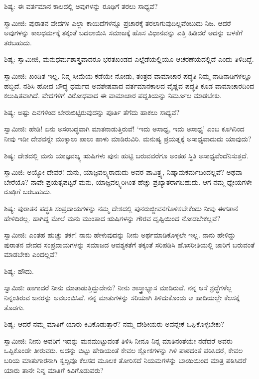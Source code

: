 ಶಿಷ್ಯ: ಈ ವರ್ತಮಾನ ಕಾಲದಲ್ಲಿ ಅವುಗಳನ್ನು ರೂಢಿಗೆ ತರಲು ಸಾಧ್ಯವೆ?

ಸ್ವಾಮೀಜಿ: ಪುರಾತನ ವೇದಗಳ ಎಲ್ಲಾ ಕಾಯಿದೆಗಳನ್ನೂ ಪ್ರಚಾರಕ್ಕೆ ತರಲಾಗುವುದಿಲ್ಲವೆಂಬುದು ನಿಜ. ಆದರೆ ಅವುಗಳನ್ನು ಕಾಲಧರ್ಮಕ್ಕೆ ತಕ್ಕಂತೆ ಬದಲಾಯಿಸಿ ಸಮಾಜಕ್ಕೆ ಹೊಸ ವಿಧಾನವನ್ನು ಎತ್ತಿ ಹಿಡಿದರೆ ಅದನ್ನು ಬಳಕೆಗೆ ತರಬಹುದು.

ಶಿಷ್ಯ: ಸ್ವಾಮೀಜಿ, ಮನುಧರ್ಮಶಾಸ್ತ್ರವಾದರೂ ಭರತಖಂಡದ ಎಲ್ಲೆಡೆಯಲ್ಲಿಯೂ ಆಚರಣೆಯದಲ್ಲಿದೆ ಎಂದು ತಿಳಿದಿದ್ದೆ.

ಸ್ವಾಮೀಜಿ: ಖಂಡಿತ ಇಲ್ಲ. ನಿನ್ನ ಸೀಮೆಯ ಕಡೆಯೇ ನೋಡು, ತಂತ್ರದ ವಾಮಾಚಾರ ಪದ್ಧತಿ ನಿಮ್ಮ ನಾಡಿನಾಡಿಗಳಲ್ಲೂ ಹಬ್ಬಿದೆ. ನಶಿಸಿ ಹೋದ ಬೌದ್ಧ ಧರ್ಮದ ಅವಶೇಷವಾದ ವರ್ತಮಾನಕಾಲದ ವೈಷ್ಣವ ಪದ್ಧತಿ ಕೂಡ ವಾಮಾಚಾರದಿಂದ ಕಲುಷಿತವಾಗಿದೆ. ವೇದಗಳಿಗೆ ವಿರೋಧವಾದ ಈ ವಾಮಾಚಾರ ಪದ್ದತಿಯನ್ನು ನಿರ್ಮೂಲ ಮಾಡಬೇಕು.

ಶಿಷ್ಯ: ಅಷ್ಟು ದಿನಗಳಿಂದ ಬೇರುಬಿಟ್ಟಿರುವುದನ್ನು ಪೂರ್ತಿ ತೆಗೆದು ಹಾಕಲು ಸಾಧ್ಯವೆ?

ಸ್ವಾಮೀಜಿ: ಹೇಡಿ! ಏನು ಅಸಂಬದ್ಧವಾಗಿ ಮಾತನಾಡುತ್ತಿರುವೆ! ‘ಇದು ಅಸಾಧ್ಯ, ಇದು ಅಸಾಧ್ಯ’ ಎಂಬ ಕೂಗಿನಿಂದ ನೀವು ಇಡೀ ದೇಶವನ್ನೇ ಮುಕ್ಕಾಲು ಪಾಲು ಹಾಳು ಮಾಡಿರುವಿರಿ. ಮನುಷ್ಯ ಪ್ರಯತ್ನಕ್ಕೆ ಅಸಾಧ್ಯವಾದುದು ಯಾವುದು?

ಶಿಷ್ಯ: ದೇಶದಲ್ಲಿ ಮನು ಯಾಜ್ಞವಲ್ಕ್ಯ ಋಷಿಗಳು ಪುನಃ ಹುಟ್ಟಿ ಬರುವವರೆಗೂ ಅಂತಹ ಸ್ಥಿತಿ ಅಸಾಧ್ಯವೆಂದೆನಿಸುತ್ತದೆ.

ಸ್ವಾಮಿಜಿ: ಅಯ್ಯೋ ದೇವರೆ! ಮನು, ಯಾಜ್ಞವಲ್ಕ್ಯರಾದುದು ಅವರ ಪಾವಿತ್ರ್ಯ, ನಿಷ್ಕಾಮಕರ್ಮದಿಂದಲ್ಲವೆ? ಅಥವಾ ಬೇರೆಯೊ? ನಾವೇ ಪ್ರಯತ್ನಪಟ್ಟರೆ ಮನು, ಯಾಜ್ಞವಲ್ಕ್ಯರಿಗಿಂತ ಹೆಚ್ಚು ಪ್ರಖ್ಯಾತರಾಗಬಹುದು. ಆಗ ನಮ್ಮ ಧ್ಯೇಯಗಳೇ ರೂಢಿಗೆ ಬರಬಹುದು.

ಶಿಷ್ಯ: ಪುರಾತನ ಪದ್ಧತಿ ಸಂಪ್ರದಾಯಗಳನ್ನು ನಮ್ಮ ದೇಶದಲ್ಲಿ ಪುನರುಜ್ಜೀವನಗೊಳಿಸಬೇಕೆಂದು ನೀವು ಈಗತಾನೆ ಹೇಳಿದಿರಲ್ಲ. ಹಾಗಿದ್ದ ಮೇಲೆ ಮನು ಮುಂತಾದ ಋಷಿಗಳನ್ನು ಗೌರವ ದೃಷ್ಟಿಯಿಂದ ನೋಡಬೇಕಲ್ಲವೆ?

ಸ್ವಾಮೀಜಿ: ಎಂತಹ ಹುಚ್ಚು ತರ್ಕ! ನಾನು ಹೇಳುವುದನ್ನು ನೀನು ಅರ್ಥಮಾಡಿಕೊಳ್ಳಲೇ ಇಲ್ಲ. ನಾನು ಹೇಳಿದ್ದು ಪುರಾತನ ವೇದದ ಸಂಪ್ರದಾಯಗಳನ್ನು ಸಮಾಜದ ಆವಶ್ಯಕತೆಗೆ ತಕ್ಕಂತೆ ಸರಿಪಡಿಸಿ ಹೊಸರೀತಿಯಲ್ಲಿ ಜಾರಿಗೆ ಬರುವಂತೆ ಮಾಡಬೇಕು ಎಂದಲ್ಲವೆ?

ಶಿಷ್ಯ: ಹೌದು.

ಸ್ವಾಮಿಜಿ: ಹಾಗಾದರೆ ನೀನು ಮಾತಾಡುತ್ತಿದ್ದುದೇನು? ನೀನು ಶಾಸ್ತ್ರಾಭ್ಯಾಸ ಮಾಡಿರುವೆ. ನನ್ನ ಆಸೆ ಶ್ರದ್ಧೆಗಳೆಲ್ಲ ನಿನ್ನಂತಿರುವ ಜನರನ್ನು ಅವಲಂಬಿಸಿವೆ. ನನ್ನ ಮಾತುಗಳನ್ನು ಸರಿಯಾಗಿ ತಿಳಿದುಕೊಂಡು ಆ ಹಾದಿಯಲ್ಲೇ ಕೆಲಸಕ್ಕೆ ತೊಡಗು.

ಶಿಷ್ಯ: ಆದರೆ ನಮ್ಮ ಮಾತಿಗೆ ಯಾರು ಕಿವಿಕೊಡುತ್ತಾರೆ? ನಮ್ಮ ದೇಶೀಯರು ಅವನ್ನೇಕೆ ಒಪ್ಪಿಕೊಳ್ಳಬೇಕು?

ಸ್ವಾಮೀಜಿ: ನೀನು ಅವರಿಗೆ ಇದನ್ನು ಮನಮುಟ್ಟುವಂತೆ ತಿಳಿಸಿ ನೀನೂ ನಿನ್ನ ಮಾತಿನಂತೆಯೇ ನಡೆದರೆ ಅವರು ಒಪ್ಪಿಕೊಂಡೇ ತೀರುವರು. ಅದನ್ನು ಬಿಟ್ಟು ಹೇಡಿಯಂತೆ ಕೇವಲ ಶ್ಲೋಕಗಳನ್ನು ಗಿಳಿ ಪಾಠದಂತೆ ಪಠಿಸಿದರೆ, ಕೇವಲ ಬರಿಯ ಮಾತುಗಾರನಾಗಿ ಸ್ವಲ್ಪವೂ ಕೆಲಸದ ಮೂಲಕ ತೋರಿಸದೆ ನಿಯಮಗಳನ್ನು ಬಾಯಿಯಿಂದ ಮಾತ್ರ ಪಠಿಸಿದರೆ ಯಾರು ತಾನೇ ನಿನ್ನ ಮಾತಿಗೆ ಕಿವಿಗೊಡುವರು?

